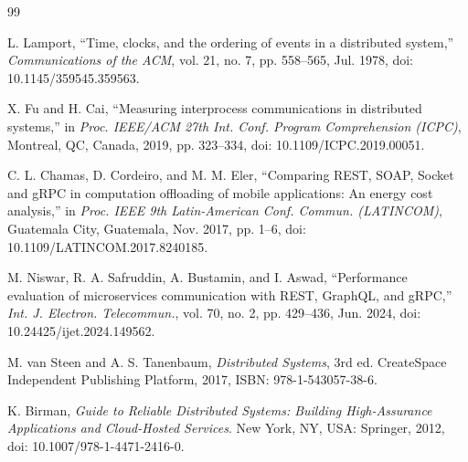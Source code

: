 \documentclass[12pt,a4paper]{article}
\begin{document}
\newpage
\begin{thebibliography}{99}

L. Lamport, ``Time, clocks, and the ordering of events in a distributed system,''
\textit{Communications of the ACM}, vol. 21, no. 7, pp. 558--565, Jul. 1978,
doi: 10.1145/359545.359563.

X. Fu and H. Cai, ``Measuring interprocess communications in distributed systems,''
in \textit{Proc. IEEE/ACM 27th Int. Conf. Program Comprehension (ICPC)},
Montreal, QC, Canada, 2019, pp. 323--334,
doi: 10.1109/ICPC.2019.00051.

C. L. Chamas, D. Cordeiro, and M. M. Eler,
``Comparing REST, SOAP, Socket and gRPC in computation offloading of mobile
applications: An energy cost analysis,''
in \textit{Proc. IEEE 9th Latin-American Conf. Commun. (LATINCOM)},
Guatemala City, Guatemala, Nov. 2017, pp. 1--6,
doi: 10.1109/LATINCOM.2017.8240185.

M. Niswar, R. A. Safruddin, A. Bustamin, and I. Aswad,
``Performance evaluation of microservices communication with REST, GraphQL,
and gRPC,''
\textit{Int. J. Electron. Telecommun.}, vol. 70, no. 2, pp. 429--436,
Jun. 2024, doi: 10.24425/ijet.2024.149562.

M. van Steen and A. S. Tanenbaum,
\textit{Distributed Systems}, 3rd ed.
CreateSpace Independent Publishing Platform, 2017,
ISBN: 978-1-543057-38-6.

K. Birman,
\textit{Guide to Reliable Distributed Systems: Building High-Assurance
Applications and Cloud-Hosted Services}.
New York, NY, USA: Springer, 2012,
doi: 10.1007/978-1-4471-2416-0.

\end{thebibliography}
\end{document}

